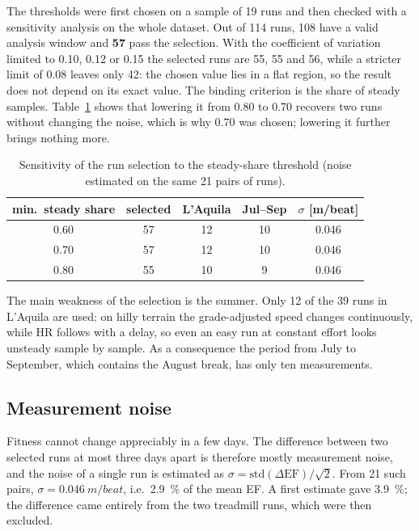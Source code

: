 \documentclass[11pt,a4paper]{article}
\begin{document}
The thresholds were first chosen on a sample of 19 runs and then checked with a
sensitivity analysis on the whole dataset. Out of 114 runs, 108 have a valid
analysis window and \textbf{57} pass the selection. With the coefficient of
variation limited to 0.10, 0.12 or 0.15 the selected runs are 55, 55 and 56,
while a stricter limit of 0.08 leaves only 42: the chosen value lies in a flat
region, so the result does not depend on its exact value. The binding criterion
is the share of steady samples. Table~\ref{tab:sensitivity} shows that lowering
it from 0.80 to 0.70 recovers two runs without changing the noise, which is
why 0.70 was chosen; lowering it further brings nothing more.

\begin{table}[ht]
\centering
\caption{Sensitivity of the run selection to the steady-share threshold
(noise estimated on the same 21 pairs of runs).}
\label{tab:sensitivity}
\begin{tabular}{@{}ccccc@{}}
\toprule
min.\ steady share & selected & L'Aquila & Jul--Sep & $\sigma$ [m/beat] \\
\midrule
0.60 & 57 & 12 & 10 & 0.046 \\
0.70 & 57 & 12 & 10 & 0.046 \\
0.80 & 55 & 10 &  9 & 0.046 \\
\bottomrule
\end{tabular}
\end{table}

The main weakness of the selection is the summer. Only 12 of the 39 runs in
L'Aquila are used: on hilly terrain the grade-adjusted speed changes
continuously, while HR follows with a delay, so even an easy run at constant
effort looks unsteady sample by sample. As a consequence the period from July
to September, which contains the August break, has only ten measurements.

\subsection{Measurement noise}
Fitness cannot change appreciably in a few days. The difference between two
selected runs at most three days apart is therefore mostly measurement noise,
and the noise of a single run is estimated as
$\sigma = \mathrm{std}(\Delta \mathrm{EF})/\sqrt{2}$. From 21 such pairs,
$\sigma = \SI{0.046}{m/beat}$, i.e.\ \SI{2.9}{\percent} of the mean EF. A first
estimate gave \SI{3.9}{\percent}; the difference came entirely from the two
treadmill runs, which were then excluded.
\end{document}
